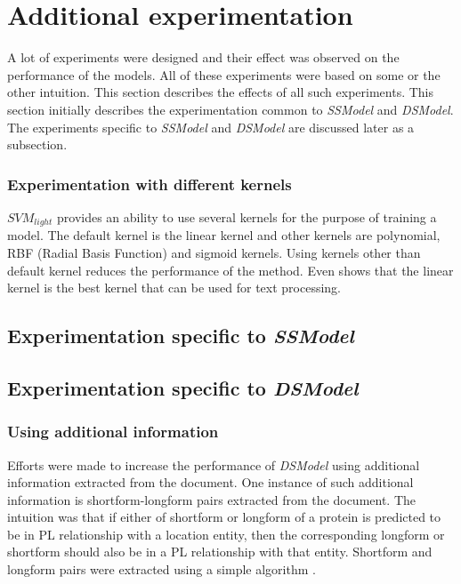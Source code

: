 \section{Additional experimentation}\label{sec:experiments}

A lot of experiments were designed and their effect was observed on the performance of the models. All of these experiments were based on some or the other intuition. This section describes the effects of all such experiments. This section initially describes the experimentation common to \textit{SSModel} and \textit{DSModel}. The experiments specific to \textit{SSModel} and \textit{DSModel} are discussed later as a subsection.

\subsubsection*{Experimentation with different kernels}

$SVM_{light}$ provides an ability to use several kernels for the purpose of training a model. The default kernel is the linear kernel and other kernels are polynomial, RBF (Radial Basis Function) and sigmoid kernels. Using kernels other than default kernel reduces the performance of the method. Even \cite{joachims1998text} shows that the linear kernel is the best kernel that can be used for text processing.

\subsection{Experimentation specific to \textit{SSModel}}

\subsection{Experimentation specific to \textit{DSModel}}

\subsubsection*{Using additional information}

Efforts were made to increase the performance of \textit{DSModel} using additional information extracted from the document. One instance of such additional information is shortform-longform pairs extracted from the document. The intuition was that if either of shortform or longform of a protein is predicted to be in PL relationship with a location entity, then the corresponding longform or shortform should also be in a PL relationship with that entity. Shortform and longform pairs were extracted using a simple algorithm \cite{hearst2003simple}.

